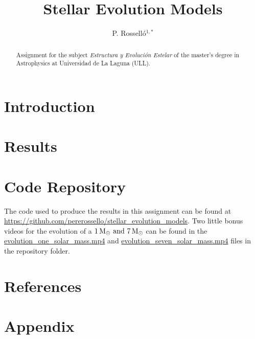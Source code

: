 \documentclass{anotherarticlestyle}
\title{Stellar Evolution Models}
\author{P. Rosselló$^{1,*}$}
\begin{document}
\maketitle

\begin{strip}
    \begin{abstract}
        {\small
            Assignment for the subject \textit{Estructura y Evolución Estelar} of the master's degree in Astrophysics at Universidad de La Laguna (ULL).
        }
    \end{abstract}
\end{strip}




\section{Introduction}


\section{Results}

\newpage
\section{Code Repository}
The code used to produce the results in this assignment can be found at \url{https://github.com/pererossello/stellar_evolution_models}. Two little bonus videos for the evolution of a $1 \, {\rm M}_\odot \ \text{and} \ 7 \,  {\rm M}_\odot$ can be found in the \url{evolution_one_solar_mass.mp4} and \url{evolution_seven_solar_mass.mp4} files in the repository folder.

\newpage
\pagebreak
\onecolumn
\twocolumn


\section*{References}




\onecolumn
\newpage
\pagebreak
\section*{Appendix}





% 

% 
\end{document}
